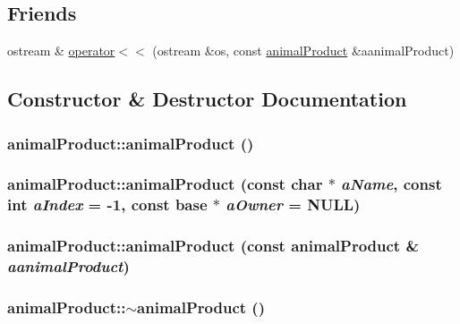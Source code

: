 \subsection*{Friends}
\begin{DoxyCompactItemize}
\item 
ostream \& \hyperlink{classanimal_product_abeaab9718f6e5b0d6ab31bff4fd06032}{operator$<$$<$} (ostream \&os, const \hyperlink{classanimal_product}{animalProduct} \&aanimalProduct)
\end{DoxyCompactItemize}


\subsection{Constructor \& Destructor Documentation}
\hypertarget{classanimal_product_a0afba5541c9f4216fb2ce2cbe806929b}{
\subsubsection[{animalProduct}]{\setlength{\rightskip}{0pt plus 5cm}animalProduct::animalProduct ()}}
\label{classanimal_product_a0afba5541c9f4216fb2ce2cbe806929b}
\hypertarget{classanimal_product_ab8322e1a7aa9fc85602834cdc9e524f5}{
\subsubsection[{animalProduct}]{\setlength{\rightskip}{0pt plus 5cm}animalProduct::animalProduct (const char $\ast$ {\em aName}, \/  const int {\em aIndex} = {\ttfamily -\/1}, \/  const {\bf base} $\ast$ {\em aOwner} = {\ttfamily NULL})}}
\label{classanimal_product_ab8322e1a7aa9fc85602834cdc9e524f5}
\hypertarget{classanimal_product_acc81bed1cce74a9f6f6aad4844e0bdfc}{
\subsubsection[{animalProduct}]{\setlength{\rightskip}{0pt plus 5cm}animalProduct::animalProduct (const {\bf animalProduct} \& {\em aanimalProduct})}}
\label{classanimal_product_acc81bed1cce74a9f6f6aad4844e0bdfc}
\hypertarget{classanimal_product_a66dd3ca277815d21b0dc42df5c3e9245}{
\subsubsection[{$\sim$animalProduct}]{\setlength{\rightskip}{0pt plus 5cm}animalProduct::$\sim$animalProduct ()}}
\label{classanimal_product_a66dd3ca277815d21b0dc42df5c3e9245}


